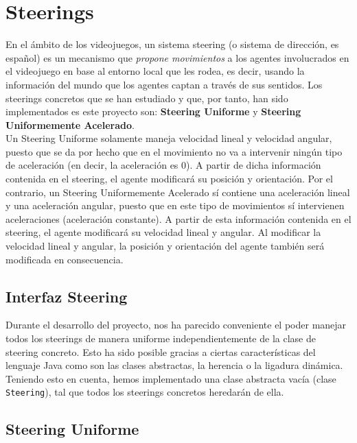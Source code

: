 \medskip
\section{Steerings}

En el ámbito de los videojuegos, un sistema steering (o sistema de dirección, es español) es un mecanismo que \textit{propone movimientos} a los agentes involucrados en el videojuego en base al entorno local que les rodea, es decir, usando la información del mundo que los agentes captan a través de sus sentidos. Los steerings concretos que se han estudiado y que, por tanto, han sido implementados es este proyecto son: \textbf{Steering Uniforme} y \textbf{Steering Uniformemente Acelerado}. \\

Un Steering Uniforme solamente maneja velocidad lineal y velocidad angular, puesto que se da por hecho que en el movimiento no va a intervenir ningún tipo de aceleración (en decir, la aceleración es 0). A partir de dicha información contenida en el steering, el agente modificará su posición y orientación. Por el contrario, un Steering Uniformemente Acelerado sí contiene una aceleración lineal y una aceleración angular, puesto que en este tipo de movimientos sí intervienen aceleraciones (aceleración constante). A partir de esta información contenida en el steering, el agente modificará su velocidad lineal y angular. Al modificar la velocidad lineal y angular, la posición y orientación del agente también será modificada en consecuencia. 

\subsection{Interfaz Steering}

Durante el desarrollo del proyecto, nos ha parecido conveniente el poder manejar todos los steerings de manera uniforme independientemente de la clase de steering concreto. Esto ha sido posible gracias a ciertas características del lenguaje Java como son las clases abstractas, la herencia o la ligadura dinámica. Teniendo esto en cuenta, hemos implementado una clase abstracta vacía (clase \texttt{Steering}), tal que todos los steerings concretos heredarán de ella.

\subsection{Steering Uniforme}

